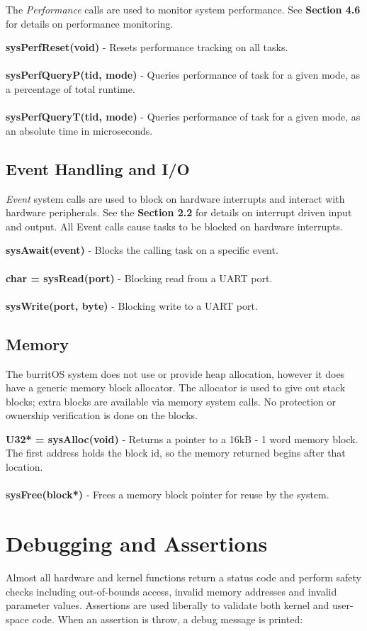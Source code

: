 \documentclass[twoside,a4paper]{refart}
\begin{document}
The \textit{Performance} calls are used to monitor system performance. See \textbf{Section 4.6} for details on performance monitoring.

\textbf{sysPerfReset(void)} - Resets performance tracking on all tasks.\\\\
\textbf{sysPerfQueryP(tid, mode)} - Queries performance of task for a given mode, as a percentage of total runtime.\\\\
\textbf{sysPerfQueryT(tid, mode)} - Queries performance of task for a given mode, as an absolute time in microseconds.

\subsection{Event Handling and I/O}

\textit{Event} system calls are used to block on hardware interrupts and interact with hardware peripherals. See the \textbf{Section 2.2} for details on interrupt driven input and output. All Event calls cause tasks to be blocked on hardware interrupts.

\textbf{sysAwait(event)} - Blocks the calling task on a specific event.\\\\
\textbf{char = sysRead(port)} - Blocking read from a UART port.\\\\
\textbf{sysWrite(port, byte)} - Blocking write to a UART port.

\subsection{Memory}

The burritOS system does not use or provide heap allocation, however it does have a generic memory block allocator. The allocator is used to give out stack blocks; extra blocks are available via memory system calls. No protection or ownership verification is done on the blocks.

\textbf{U32* = sysAlloc(void)} - Returns a pointer to a 16kB - 1 word memory block. The first address holds the block id, so the memory returned begins after that location.\\\\
\textbf{sysFree(block*)} - Frees a memory block pointer for reuse by the system.

\section{Debugging and Assertions}
 Almost all hardware and kernel functions return a status code and perform safety checks including out-of-bounds access, invalid memory addresses and invalid parameter values. Assertions are used liberally to validate both kernel and user-space code. When an assertion is throw, a debug message is printed:
\end{document}
